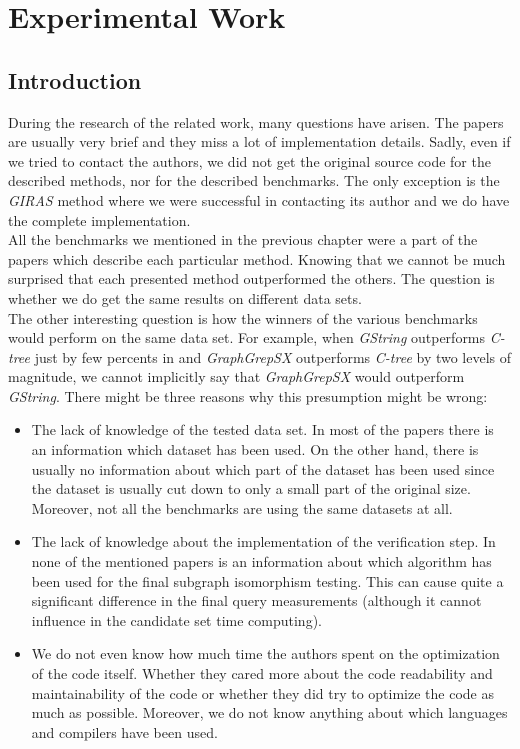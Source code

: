 \chapter{Experimental Work} \label{experimental}
\section{Introduction}
During the research of the related work, many questions have arisen. The papers are usually very brief and they miss a lot of implementation details. Sadly, even if we tried to contact the authors, we did not get the original source code for the described methods, nor for the described benchmarks. The only exception is the \textit{GIRAS} method where we were successful in contacting its author and we do have the complete implementation.\\

All the benchmarks we mentioned in the previous chapter were a part of the papers which describe each particular method. Knowing that we cannot be much surprised that each presented method outperformed the others. The question is whether we do get the same results on different data sets.\\

The other interesting question is how the winners of the various benchmarks would perform on the same data set. For example, when \textit{GString} outperforms \textit{C-tree} just by few percents in \cite{GString} and \textit{GraphGrepSX} outperforms \textit{C-tree} by two levels of magnitude, we cannot implicitly say that \textit{GraphGrepSX} would outperform \textit{GString}. There might be three reasons why this presumption might be wrong:

\begin{itemize}
	\item The lack of knowledge of the tested data set. In most of the papers there is an information which dataset has been used. On the other hand, there is usually no information about which part of the dataset has been used since the dataset is usually cut down to only a small part of the original size. Moreover, not all the benchmarks are using the same datasets at all.
	
	\item The lack of knowledge about the implementation of the verification step. In none of the mentioned papers is an information about which algorithm has been used for the final subgraph isomorphism testing. This can cause quite a significant difference in the final query measurements (although it cannot influence in the candidate set time computing).
	
	\item We do not even know how much time the authors spent on the optimization of the code itself. Whether they cared more about the code readability and maintainability of the code or whether they did try to optimize the code as much as possible. Moreover, we do not know anything about which languages and compilers have been used.
\end{itemize}

